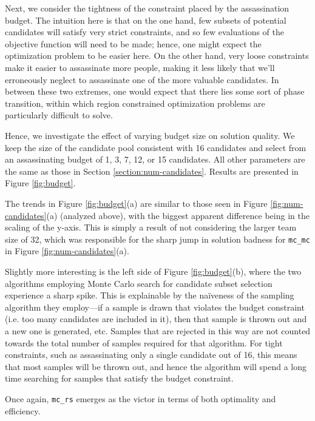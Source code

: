 Next, we consider the tightness of the constraint placed by the assassination budget.
The intuition here is that on the one hand, few subsets of potential candidates will satisfy very strict constraints, and so few evaluations of the objective function will need to be made; hence, one might expect the optimization problem to be easier here.
On the other hand, very loose constraints make it easier to assassinate more people, making it less likely that we'll erroneously neglect to assassinate one of the more valuable candidates.
In between these two extremes, one would expect that there lies some sort of phase transition, within which region constrained optimization problems are particularly difficult to solve.

Hence, we investigate the effect of varying budget size on solution quality.
We keep the size of the candidate pool consistent with 16 candidates and select from an assassinating budget of 1, 3, 7, 12, or 15 candidates.
All other parameters are the same as those in Section \ref{section:num-candidates}.
Results are presented in Figure \ref{fig:budget}.

The trends in Figure \ref{fig:budget}(a) are similar to those seen in Figure \ref{fig:num-candidates}(a) (analyzed above), with the biggest apparent difference being in the scaling of the y-axis.
This is simply a result of not considering the larger team size of 32, which was responsible for the sharp jump in solution badness for \texttt{mc\_mc} in Figure \ref{fig:num-candidates}(a).

Slightly more interesting is the left side of Figure \ref{fig:budget}(b), where the two algorithms employing Monte Carlo search for candidate subset selection experience a sharp spike.
This is explainable by the na\"iveness of the sampling algorithm they employ---if a sample is drawn that violates the budget constraint (i.e. too many candidates are included in it), then that sample is thrown out and a new one is generated, etc.
Samples that are rejected in this way are not counted towards the total number of samples required for that algorithm.
For tight constraints, such as assassinating only a single candidate out of 16, this means that most samples will be thrown out, and hence the algorithm will spend a long time searching for samples that satisfy the budget constraint.

Once again, \texttt{mc\_rs} emerges as the victor in terms of both optimality and efficiency.
